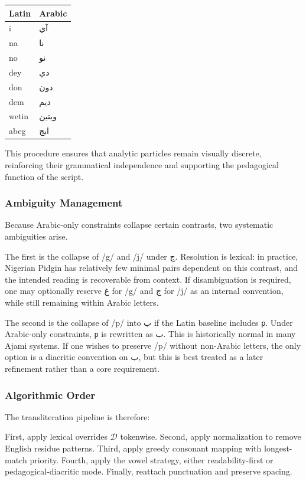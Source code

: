 \documentclass[12pt]{article}
\newcommand{\AR}[1]{\foreignlanguage{arabic}{#1}}
\begin{document}
\begin{center}
\begin{tabular}{ll}
Latin & Arabic \\
\hline
i & \AR{آي} \\
na & \AR{نا} \\
no & \AR{نو} \\
dey & \AR{دي} \\
don & \AR{دون} \\
dem & \AR{ديم} \\
wetin & \AR{ويتين} \\
abeg & \AR{ابج} \\
\end{tabular}
\end{center}

This procedure ensures that analytic particles remain visually discrete, reinforcing their grammatical independence and supporting the pedagogical function of the script.

\subsubsection{Ambiguity Management}

Because Arabic-only constraints collapse certain contrasts, two systematic ambiguities arise.

The first is the collapse of /g/ and /j/ under \AR{ج}. Resolution is lexical: in practice, Nigerian Pidgin has relatively few minimal pairs dependent on this contrast, and the intended reading is recoverable from context. If disambiguation is required, one may optionally reserve \AR{غ} for /g/ and \AR{ج} for /j/ as an internal convention, while still remaining within Arabic letters.

The second is the collapse of /p/ into \AR{ب} if the Latin baseline includes \texttt{p}. Under Arabic-only constraints, \texttt{p} is rewritten as \AR{ب}. This is historically normal in many Ajami systems. If one wishes to preserve /p/ without non-Arabic letters, the only option is a diacritic convention on \AR{ب}, but this is best treated as a later refinement rather than a core requirement.

\subsubsection{Algorithmic Order}

The transliteration pipeline is therefore:

First, apply lexical overrides $\mathcal{D}$ tokenwise. Second, apply normalization to remove English residue patterns. Third, apply greedy consonant mapping with longest-match priority. Fourth, apply the vowel strategy, either readability-first or pedagogical-diacritic mode. Finally, reattach punctuation and preserve spacing.
\end{document}
